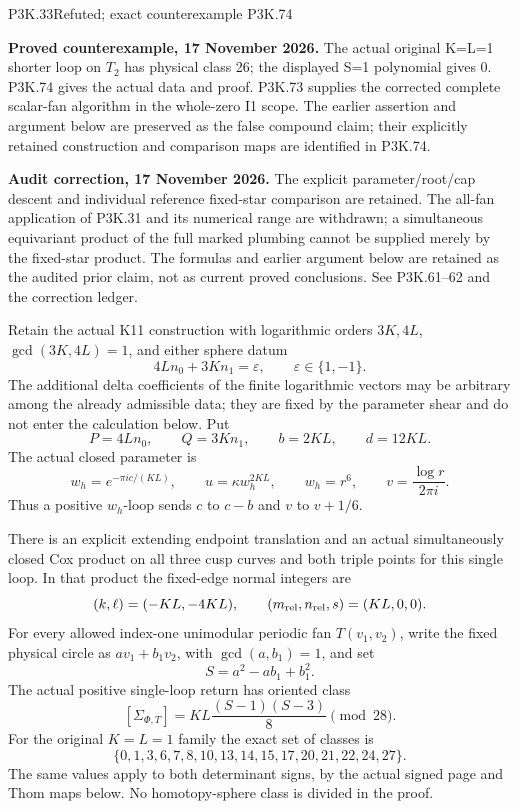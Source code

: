 \begin{statement}{P3K.33}{Refuted; exact counterexample P3K.74}
\par\noindent\textbf{Proved counterexample, 17 November 2026.} The actual original K=L=1 shorter loop on \(T_2\) has physical class 26; the displayed S=1 polynomial gives 0. P3K.74 gives the actual data and proof. P3K.73 supplies the corrected complete scalar-fan algorithm in the whole-zero I1 scope. The earlier assertion and argument below are preserved as the false compound claim; their explicitly retained construction and comparison maps are identified in P3K.74.

\par\noindent\textbf{Audit correction, 17 November 2026.} The explicit parameter/root/cap descent and individual reference fixed-star comparison are retained. The all-fan application of P3K.31 and its numerical range are withdrawn; a simultaneous equivariant product of the full marked plumbing cannot be supplied merely by the fixed-star product. The formulas and earlier argument below are retained as the audited prior claim, not as current proved conclusions. See P3K.61--62 and the correction ledger.
\medskip

Retain the actual K11 construction with logarithmic orders \(3K,4L\),
\(\gcd(3K,4L)=1\), and either sphere datum
\[
       4Ln_0+3Kn_1=\varepsilon,\qquad \varepsilon\in\{1,-1\}.
\]
The additional delta coefficients of the finite logarithmic vectors may
be arbitrary among the already admissible data; they are fixed by the
parameter shear and do not enter the calculation below. Put
\[
 P=4Ln_0,\qquad Q=3Kn_1,\qquad b=2KL,\qquad d=12KL.
\]
The actual closed parameter is
\[
 w_h=e^{-\pi i c/(KL)},\qquad u=\kappa w_h^{2KL},
 \qquad w_h=r^6,\qquad v=\frac{\log r}{2\pi i}.
\]
Thus a positive \(w_h\)-loop sends \(c\) to \(c-b\) and
\(v\) to \(v+1/6\).

There is an explicit extending endpoint translation and an actual
simultaneously closed Cox product on all three cusp curves and both
triple points for this single loop. In that product the fixed-edge
normal integers are
\[
          (k,\ell)=(-KL,-4KL),\qquad
          (m_{\rm rel},n_{\rm rel},s)=(KL,0,0).
\]
For every allowed index-one unimodular periodic fan \(T(v_1,v_2)\),
write the fixed physical circle as \(a v_1+b_1v_2\), with
\(\gcd(a,b_1)=1\), and set
\[
                 S=a^2-ab_1+b_1^2.
\]
The actual positive single-loop return has oriented class
\[
       [\Sigma_{\Phi,T}]
          =KL\frac{(S-1)(S-3)}8\pmod {28}.                 \tag{P3K.33.1}
\]
For the original \(K=L=1\) family the exact set of classes is
\[
 \{0,1,3,6,7,8,10,13,14,15,17,20,21,22,24,27\}.
\]
The same values apply to both determinant signs, by the actual signed
page and Thom maps below. No homotopy-sphere class is divided in the proof.
\end{statement}
